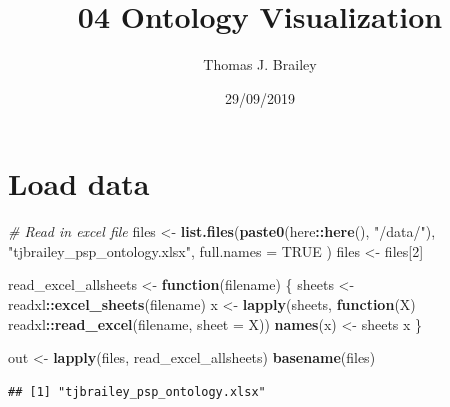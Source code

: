 \documentclass[
]{article}
\title{04 Ontology Visualization}
\author{Thomas J. Brailey}
\date{29/09/2019}
\newenvironment{Shaded}{\begin{snugshade}}{\end{snugshade}}
\newcommand{\CommentTok}[1]{\textcolor[rgb]{0.56,0.35,0.01}{\textit{#1}}}
\newcommand{\ControlFlowTok}[1]{\textcolor[rgb]{0.13,0.29,0.53}{\textbf{#1}}}
\newcommand{\DataTypeTok}[1]{\textcolor[rgb]{0.13,0.29,0.53}{#1}}
\newcommand{\DecValTok}[1]{\textcolor[rgb]{0.00,0.00,0.81}{#1}}
\newcommand{\KeywordTok}[1]{\textcolor[rgb]{0.13,0.29,0.53}{\textbf{#1}}}
\newcommand{\NormalTok}[1]{#1}
\newcommand{\OperatorTok}[1]{\textcolor[rgb]{0.81,0.36,0.00}{\textbf{#1}}}
\newcommand{\OtherTok}[1]{\textcolor[rgb]{0.56,0.35,0.01}{#1}}
\newcommand{\StringTok}[1]{\textcolor[rgb]{0.31,0.60,0.02}{#1}}
\begin{document}
\maketitle

{
\setcounter{tocdepth}{2}
\tableofcontents
}
\hypertarget{load-data}{%
\section{Load data}\label{load-data}}

\begin{Shaded}
\begin{Highlighting}[]
\CommentTok{# Read in excel file }
\NormalTok{files <-}\StringTok{ }\KeywordTok{list.files}\NormalTok{(}\KeywordTok{paste0}\NormalTok{(here}\OperatorTok{::}\KeywordTok{here}\NormalTok{(), }\StringTok{"/data/"}\NormalTok{), }
                    \StringTok{"tjbrailey_psp_ontology.xlsx"}\NormalTok{, }
                    \DataTypeTok{full.names =} \OtherTok{TRUE}
\NormalTok{                    )}
\NormalTok{files <-}\StringTok{ }\NormalTok{files[}\DecValTok{2}\NormalTok{]}

\NormalTok{read_excel_allsheets <-}\StringTok{ }\ControlFlowTok{function}\NormalTok{(filename) \{ }
\NormalTok{  sheets <-}\StringTok{ }\NormalTok{readxl}\OperatorTok{::}\KeywordTok{excel_sheets}\NormalTok{(filename) }
\NormalTok{  x <-}\StringTok{ }\KeywordTok{lapply}\NormalTok{(sheets, }\ControlFlowTok{function}\NormalTok{(X) readxl}\OperatorTok{::}\KeywordTok{read_excel}\NormalTok{(filename, }\DataTypeTok{sheet =}\NormalTok{ X)) }
  \KeywordTok{names}\NormalTok{(x) <-}\StringTok{ }\NormalTok{sheets }
\NormalTok{  x }
\NormalTok{\} }

\NormalTok{out <-}\StringTok{ }\KeywordTok{lapply}\NormalTok{(files, read_excel_allsheets)}
\KeywordTok{basename}\NormalTok{(files)}
\end{Highlighting}
\end{Shaded}

\begin{verbatim}
## [1] "tjbrailey_psp_ontology.xlsx"
\end{verbatim}

\begin{Shaded}
\end{Shaded}
\end{document}
